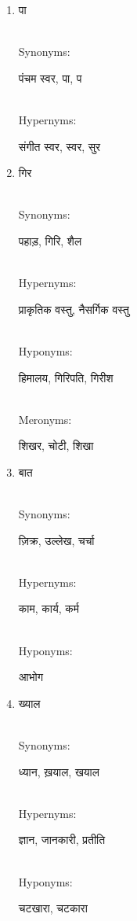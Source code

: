 \documentclass{article}
\begin{document}
\begin{enumerate}
\item \begin{hindi}पा\end{hindi} \\
Synonyms: \begin{hindi}पंचम स्वर, पा, प\end{hindi} \\
Hypernyms: \begin{hindi}संगीत स्वर, स्वर, सुर\end{hindi}

\item \begin{hindi}गिर\end{hindi} \\
Synonyms: \begin{hindi}पहाड़, गिरि, शैल\end{hindi} \\
Hypernyms: \begin{hindi}प्राकृतिक वस्तु, नैसर्गिक वस्तु\end{hindi} \\
Hyponyms: \begin{hindi}हिमालय, गिरिपति, गिरीश\end{hindi} \\
Meronyms: \begin{hindi}शिखर, चोटी, शिखा\end{hindi}

\item \begin{hindi}बात\end{hindi} \\
Synonyms: \begin{hindi}ज़िक्र, उल्लेख, चर्चा\end{hindi} \\
Hypernyms: \begin{hindi}काम, कार्य, कर्म\end{hindi} \\
Hyponyms: \begin{hindi}आभोग\end{hindi}

\item \begin{hindi}ख्याल\end{hindi} \\
Synonyms: \begin{hindi}ध्यान, ख़याल, खयाल\end{hindi} \\
Hypernyms: \begin{hindi}ज्ञान, जानकारी, प्रतीति\end{hindi} \\
Hyponyms: \begin{hindi}चटखारा, चटकारा\end{hindi}


\end{enumerate}
\end{document}
